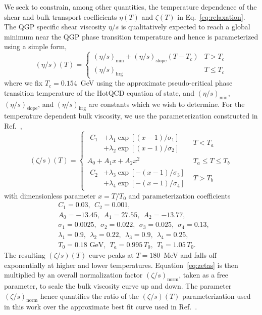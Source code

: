 \documentclass[aps,prc,reprint,amsmath,nofootinbib,superscriptaddress]{revtex4-1}
\begin{document}
We seek to constrain, among other quantities, the temperature dependence of the shear and bulk transport coefficients $\eta(T)$ and $\zeta(T)$ in Eq.~\eqref{eq:relaxation}.
The QGP specific shear viscosity $\eta/s$ is qualitatively expected to reach a global minimum near the QGP phase transition temperature and hence is parameterized using a simple form,
\begin{equation}
  (\eta/s)(T) =
  \begin{cases}
    (\eta/s)_\text{min} + (\eta/s)_\text{slope} (T - T_c) & T > T_c \\
    (\eta/s)_\text{hrg}                                   & T \le T_c
  \end{cases}
  \label{eq:etas}
\end{equation}
where we fix $T_c = 0.154$~GeV using the approximate pseudo-critical phase transition temperature of the HotQCD equation of state, and $(\eta/s)_\text{min}$, $(\eta/s)_\text{slope}$, and $(\eta/s)_\text{hrg}$ are constants which we wish to determine.
For the temperature dependent bulk viscosity, we use the parameterization constructed in Ref.~\cite{Denicol:2009am, Ryu:2015vwa},
\begin{equation}
  (\zeta/s)(T) =
  \begin{cases}
    \begin{aligned}
      C_1 &+ \lambda_1 \exp [(x-1)/\sigma_1]  \\ &+ \lambda_2 \exp [ (x-1)/\sigma_2]
    \end{aligned}
    &T < T_a \\[3ex]
    A_0 + A_1 x + A_2 x^2 &T_a \le T \le T_b \\[2ex]
    \begin{aligned}
      C_2 &+ \lambda_3 \exp [-(x-1)/\sigma_3]  \\ &+ \lambda_4 \exp [-(x-1)/\sigma_4]
    \end{aligned}
    &T > T_b
  \end{cases}
  \label{eq:zetas}
\end{equation}
with dimensionless parameter $x = T/T_0$ and parameterization coefficients
\begin{align*}
  &C_1=0.03, ~~C_2=0.001, \\
  &A_0=-13.45, ~~A_1=27.55, ~~A_2=-13.77, \\
  &\sigma_1=0.0025, ~~\sigma_2=0.022, ~~\sigma_3=0.025, ~~\sigma_4=0.13, \\
  &\lambda_1=0.9, ~~\lambda_2=0.22, ~~\lambda_3=0.9, ~~\lambda_4=0.25, \\
  &T_0 = 0.18 \text{ GeV}, ~~T_a = 0.995\, T_0, ~~T_b = 1.05\, T_0.
\end{align*}
The resulting $(\zeta/s)(T)$ curve peaks at $T=180$~MeV and falls off exponentially at higher and lower temperatures.
Equation~\eqref{eq:zetas} is then multiplied by an overall normalization factor $(\zeta/s)_\text{norm}$, taken as a free parameter, to scale the bulk viscosity curve up and down.
The parameter $(\zeta/s)_\text{norm}$ hence quantifies the ratio of the $(\zeta/s)(T)$ parameterization used in this work over the approximate best fit curve used in Ref.~\cite{Ryu:2015vwa}.
\end{document}
